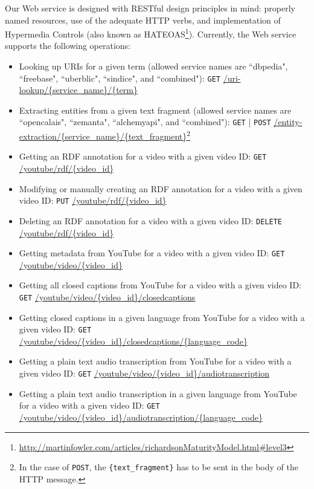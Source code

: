 \documentclass[conference]{IEEEtran}
\begin{document}
Our Web service is designed with RESTful design principles in mind: properly named resources, use of the adequate HTTP
verbs, and implementation of Hypermedia Controls (also known as
HATEOAS\footnote{\url{http://martinfowler.com/articles/richardsonMaturityModel.html#level3}}). Currently, the Web
service supports the following operations:
\begin{itemize}
\item Looking up URIs for a given term (allowed service names are ``dbpedia", ``freebase", ``uberblic", ``sindice", and ``combined"): \texttt{GET} \url{/uri-lookup/{service_name}/{term}}
\item Extracting entities from a given text fragment (allowed service names are ``opencalais", ``zemanta", ``alchemyapi", and ``combined"): \texttt{GET} | \texttt{POST} \url{/entity-extraction/{service_name}/{text_fragment}}\footnote{In the case of \texttt{POST}, the \texttt{\{text\_fragment\}} has to be sent in the body of the HTTP message.}
\item Getting an RDF annotation for a video with a given video ID: \texttt{GET} \url{/youtube/rdf/{video_id}}
\item Modifying or manually creating an RDF annotation for a video with a given video ID: \texttt{PUT} \url{/youtube/rdf/{video_id}}
\item Deleting an RDF annotation for a video with a given video ID: \texttt{DELETE} \url{/youtube/rdf/{video_id}}
\item Getting metadata from YouTube for a video with a given video ID: \texttt{GET} \url{/youtube/video/{video_id}}
\item Getting all closed captions from YouTube for a video with a given video ID: \texttt{GET} \url{/youtube/video/{video_id}/closedcaptions}
\item Getting closed captions in a given language from YouTube for a video with a given video ID: \texttt{GET} \url{/youtube/video/{video_id}/closedcaptions/{language_code}}
\item Getting a plain text audio transcription from YouTube for a video with a given video ID: \texttt{GET} \url{/youtube/video/{video_id}/audiotranscription}
\item Getting a plain text audio transcription in a given language from YouTube for a video with a given video ID: \texttt{GET} \url{/youtube/video/{video_id}/audiotranscription/{language_code}}
\end{itemize}

\end{document}
